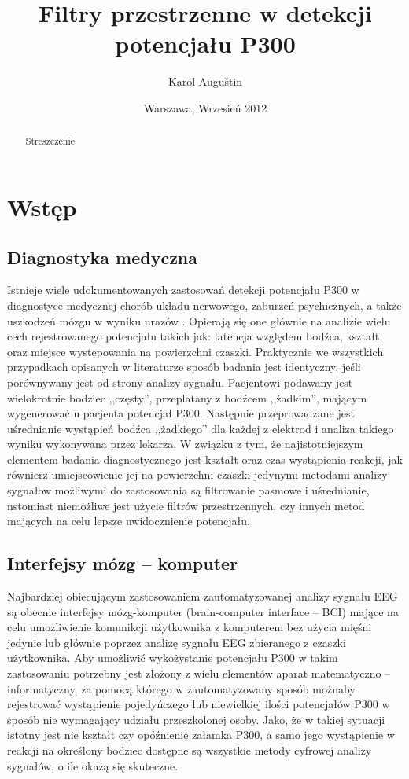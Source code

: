\documentclass[licencjacka,openright]{pracamgr}
\author{ Karol Auguštin }
\title{ Filtry przestrzenne w detekcji potencjału P300 }
\date{Warszawa, Wrzesień 2012}
\begin{document}
\let\cleardoublepage\clearpage
\maketitle
\begin{abstract}
\par Streszczenie
\end{abstract}
\tableofcontents

\chapter{Wstęp}
\section{Diagnostyka medyczna}
Istnieje wiele udokumentowanych zastosowań detekcji potencjału P300 w diagnostyce medycznej chorób układu nerwowego, zaburzeń psychicznych, a także uszkodzeń mózgu w wyniku urazów \citep{zgorzalewicz2000}. Opierają się one głównie na analizie wielu cech rejestrowanego potencjału takich jak: latencja względem bodźca, kształt, oraz miejsce występowania na powierzchni czaszki. Praktycznie we wszystkich przypadkach opisanych w literaturze sposób badania jest identyczny, jeśli porównywany jest od strony analizy sygnału. Pacjentowi podawany jest wielokrotnie bodziec ,,częsty'', przeplatany z bodźcem ,,żadkim'', mającym wygenerować u pacjenta potencjał P300. Następnie przeprowadzane jest uśrednianie wystąpień bodźca ,,żadkiego'' dla każdej z elektrod i analiza takiego wyniku wykonywana przez lekarza. W związku z tym, że najistotniejszym elementem badania diagnostycznego jest kształt oraz czas wystąpienia reakcji, jak równierz umiejscowienie jej na powierzchni czaszki jedynymi metodami analizy sygnałow możliwymi do zastosowania są filtrowanie pasmowe i uśrednianie, nstomiast niemożliwe jest użycie filtrów przestrzennych, czy innych metod mających na celu lepsze uwidocznienie potencjału.
\section{Interfejsy mózg -- komputer}
Najbardziej obiecującym zastosowaniem zautomatyzowanej analizy sygnału EEG są obecnie interfejsy mózg-komputer (brain-computer interface -- BCI) mające na celu umożliwienie komunikcji użytkownika z komputerem bez użycia mięśni jedynie lub głównie poprzez analizę sygnału EEG zbieranego z czaszki użytkownika. Aby umożliwić wykożystanie potencjału P300 w takim zastosowaniu potrzebny jest złożony z wielu elementów aparat matematyczno -- informatyczny, za pomocą którego w zautomatyzowany sposób możnaby rejestrować wystąpienie pojedyńczego lub niewielkiej ilości potencjałów P300 w sposób nie wymagający udziału przeszkolonej osoby. Jako, że w takiej sytuacji istotny jest nie kształt czy opóźnienie załamka P300, a samo jego wystąpienie w reakcji na określony bodziec dostępne są wszystkie metody cyfrowej analizy sygnałów, o ile okażą się skuteczne.
\end{document}
